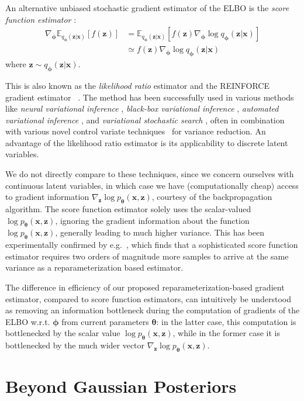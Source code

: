 \documentclass[MAL,biber]{nowfnt} %
\newcommand{\bb}[1]{\mathbf{#1}}
\newcommand{\bx}{\bb{x}}
\newcommand{\bz}{\bb{z}}
\newcommand{\bT}{\boldsymbol{\theta}}
\newcommand{\bphi}{\boldsymbol{\phi}}
\newcommand{\pT}{p_{\bT}}
\newcommand{\qP}{q_{\bphi}}
\newcommand{\Exp}[2]{\mathbb{E}_{#1}\left[#2\right]}
\begin{document}
An alternative unbiased stochastic gradient estimator of the ELBO is the \emph{score function estimator} \citep{kleijnen1996optimization}:
\begin{align}
\nabla_{\bphi} \Exp{\qP(\bz|\bx)}{f(\bz)}
&= \Exp{\qP(\bz|\bx)}{f(\bz) \nabla_{\bphi} \log \qP(\bz|\bx) } \\
&\simeq f(\bz) \nabla_{\bphi} \log \qP(\bz|\bx)
\end{align}
where $\bz \sim \qP(\bz|\bx)$.

This is also known as the \emph{likelihood ratio} estimator \citep{glynn1990likelihood,fu2006gradient} and the REINFORCE gradient estimator ~\citep{williams1992simple}. The method has been successfully used in various methods like \emph{neural variational inference} \citep{mnih2014neural}, \emph{black-box variational inference} \citep{ranganath2013black}, \emph{automated variational inference}  \citep{wingate2013automated}, and \emph{variational stochastic search} \citep{paisley2012variational}, often in combination with various novel control variate techniques~\citep{glasserman2013monte} for variance reduction. An advantage of the likelihood ratio estimator is its applicability to discrete latent variables.

We do not directly compare to these techniques, since we concern ourselves with continuous latent variables, in which case we have (computationally cheap) access to gradient information $\nabla_{\bz} \log \pT(\bx,\bz)$, courtesy of the backpropagation algorithm. The score function estimator solely uses the scalar-valued $\log \pT(\bx,\bz)$, ignoring the gradient information about the function $\log \pT(\bx,\bz)$, generally leading to much higher variance. This has been experimentally confirmed by e.g.~\citep{kucukelbir2016automatic}, which finds that a sophisticated score function estimator requires two orders of magnitude more samples to arrive at the same variance as a reparameterization based estimator.

The difference in efficiency of our proposed reparameterization-based gradient estimator, compared to score function estimators, can intuitively be understood as removing an information bottleneck during the computation of gradients of the ELBO w.r.t. $\bphi$ from current parameters $\bT$: in the latter case, this computation is bottlenecked by the scalar value $\log \pT(\bx,\bz)$, while in the former case it is bottlenecked by the much wider vector $\nabla_\bz \log \pT(\bx,\bz)$.

\chapter{Beyond Gaussian Posteriors}
\label{chap:advanced_q}
\end{document}
